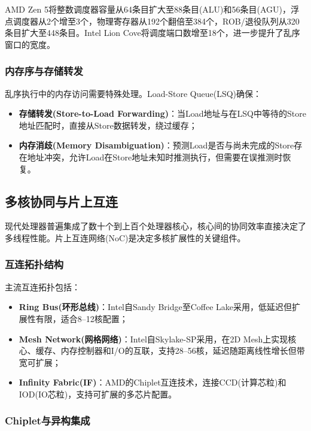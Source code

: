 \documentclass[12pt,a4paper]{IEEEtran}
\begin{document}
AMD Zen 5将整数调度器容量从64条目扩大至88条目(ALU)和56条目(AGU)，浮点调度器从2个增至3个，物理寄存器从192个翻倍至384个，ROB/退役队列从320条目扩大至448条目\cite{amd2024zen5}。Intel Lion Cove将调度端口数增至18个，进一步提升了乱序窗口的宽度。

\subsubsection{内存序与存储转发}

乱序执行中的内存访问需要特殊处理。Load-Store Queue(LSQ)确保：
\begin{itemize}
\item \textbf{存储转发(Store-to-Load Forwarding)}：当Load地址与在LSQ中等待的Store地址匹配时，直接从Store数据转发，绕过缓存；
\item \textbf{内存消歧(Memory Disambiguation)}：预测Load是否与尚未完成的Store存在地址冲突，允许Load在Store地址未知时推测执行，但需要在误推测时恢复\cite{kessler1999alpha21264}。
\end{itemize}

\subsection{多核协同与片上互连}

现代处理器普遍集成了数十个到上百个处理器核心，核心间的协同效率直接决定了多线程性能。片上互连网络(NoC)是决定多核扩展性的关键组件\cite{dally2004principles}。

\subsubsection{互连拓扑结构}

主流互连拓扑包括：
\begin{itemize}
\item \textbf{Ring Bus(环形总线)}：Intel自Sandy Bridge至Coffee Lake采用，低延迟但扩展性有限，适合8--12核配置；
\item \textbf{Mesh Network(网格网络)}：Intel自Skylake-SP采用，在2D Mesh上实现核心、缓存、内存控制器和I/O的互联，支持28--56核，延迟随距离线性增长但带宽可扩展；
\item \textbf{Infinity Fabric(IF)}：AMD的Chiplet互连技术，连接CCD(计算芯粒)和IOD(IO芯粒)，支持可扩展的多芯片配置\cite{amd2022infinityfabric}。
\end{itemize}

\subsubsection{Chiplet与异构集成}
\end{document}
